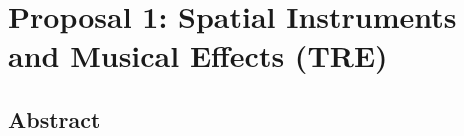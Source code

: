 \chapter{Proposal 1: Spatial Instruments and Musical Effects (TRE)}














\section{Abstract}

